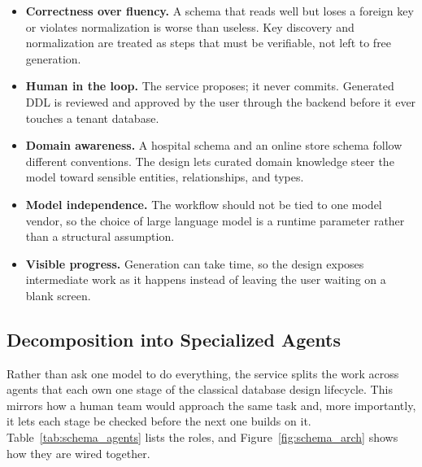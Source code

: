 \begin{itemize}
    \item \textbf{Correctness over fluency.} A schema that reads well but loses a foreign key or violates normalization is worse than useless. Key discovery and normalization are treated as steps that must be verifiable, not left to free generation.
    \item \textbf{Human in the loop.} The service proposes; it never commits. Generated DDL is reviewed and approved by the user through the backend before it ever touches a tenant database.
    \item \textbf{Domain awareness.} A hospital schema and an online store schema follow different conventions. The design lets curated domain knowledge steer the model toward sensible entities, relationships, and types.
    \item \textbf{Model independence.} The workflow should not be tied to one model vendor, so the choice of large language model is a runtime parameter rather than a structural assumption.
    \item \textbf{Visible progress.} Generation can take time, so the design exposes intermediate work as it happens instead of leaving the user waiting on a blank screen.
\end{itemize}

\subsection{Decomposition into Specialized Agents}

Rather than ask one model to do everything, the service splits the work across agents that each own one stage of the classical database design lifecycle. This mirrors how a human team would approach the same task and, more importantly, it lets each stage be checked before the next one builds on it. Table~\ref{tab:schema_agents} lists the roles, and Figure~\ref{fig:schema_arch} shows how they are wired together.

